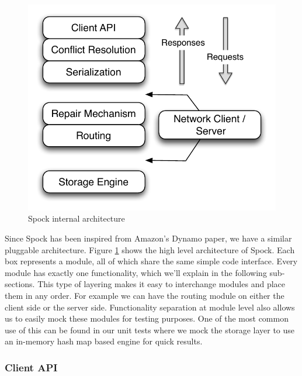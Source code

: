\documentclass[twocolumn]{article}
\newcommand{\projectname}{Spock}
\begin{document}
\begin{figure}
  \centering
    \includegraphics[scale=0.45]{images/arch.pdf}
  \caption{\projectname{} internal architecture}
  \label{arch}
\end{figure}


Since \projectname{} has been inspired from Amazon's Dynamo paper, we have a similar pluggable architecture. Figure \ref{arch} shows the high level architecture of \projectname{}. Each box represents a module, all of which share the same simple code interface. Every module has exactly one functionality, which we'll explain in the following sub-sections. This type of layering makes it easy to interchange modules and place them in any order. For example we can have the routing module on either the client side or the server side. Functionality separation at module level also allows us to easily mock these modules for testing purposes. One of the most common use of this can be found in our unit tests where we mock the storage layer to use an in-memory hash map based engine for quick results.  


\subsubsection {Client API }  
\label{sec:system_architecture:system_components:client_api}
\end{document}
